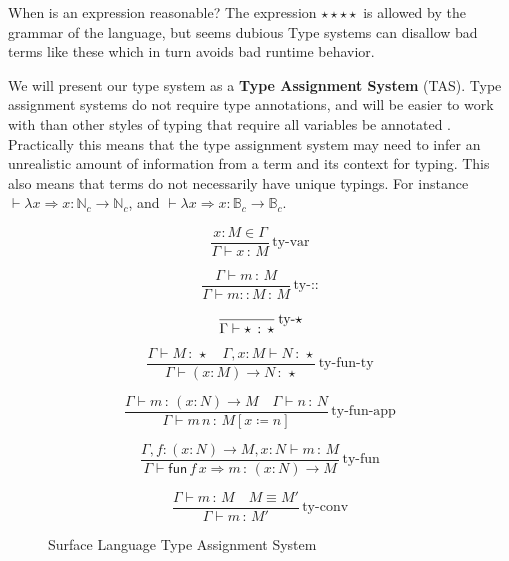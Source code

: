 When is an expression reasonable? The expression $\star\star\star\star$ is allowed by the grammar of the language, but seems dubious%
Type systems can disallow bad terms like these which in turn avoids bad runtime behavior.

We will present our type system as a \textbf{Type Assignment System} (TAS).
Type assignment systems do not require type annotations, and will be easier to work with than other styles of typing that require all variables be annotated  .
Practically this means that the type assignment system may need to infer an unrealistic amount of information from a term and its context for typing.
This also means that terms do not necessarily have unique typings.
For instance $\vdash\lambda x\Rightarrow x:\mathbb{N}_{c}\rightarrow\mathbb{N}_{c}$, and $\vdash\lambda x\Rightarrow x:\mathbb{B}_{c}\rightarrow\mathbb{B}_{c}$.




\begin{figure}
\[
\frac{x:M\in\Gamma}{\Gamma\vdash x\,:\,M}\,\textrm{ty-var}
\]

\[
\frac{\Gamma\vdash m\,:\,M}{\Gamma\vdash m::M\,:\,M}\,\textrm{ty-::}
\]

\[
\frac{{\color{gray}\ }}{\Gamma\vdash\star\,:\,\star}\,\textrm{ty-}\star
\]

\[
\frac{\Gamma\vdash M\,:\,\star\quad\Gamma,x:M\vdash N\,:\,\star}{\Gamma\vdash\left(x:M\right)\rightarrow N\,:\,\star}\,\textrm{ty-fun-ty}
\]

\[
\frac{\Gamma\vdash m\,:\,\left(x:N\right)\rightarrow M\quad\Gamma\vdash n\,:\,N}{\Gamma\vdash m\,n\,:\,M\left[x\coloneqq n\right]}\,\textrm{ty-fun-app}
\]

\[
\frac{\Gamma,f:\left(x:N\right)\rightarrow M,x:N\vdash m\,:\,M}{\Gamma\vdash\mathsf{fun}\,f\,x\Rightarrow m\,:\,\left(x:N\right)\rightarrow M}\,\textrm{ty-fun}
\]

\[
\frac{\Gamma\vdash m\,:\,M\quad M\equiv M'}{\Gamma\vdash m\,:\,M'}\,\textrm{ty-conv}
\]



\caption{Surface Language Type Assignment System}
\label{fig:surface-TAS}
\end{figure}

